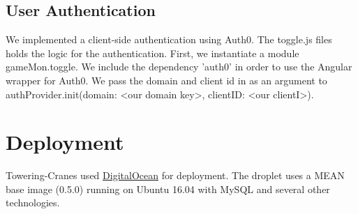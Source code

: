 \documentclass{article}
\begin{document}
\subsection{User Authentication}
We implemented a client-side authentication using Auth0. The toggle.js files holds the logic for the authentication. First, we instantiate a module gameMon.toggle. We include the dependency 'auth0' in order to use the Angular wrapper for Auth0. We pass the domain and client id in as an argument to authProvider.init({domain: <our domain key>, clientID: <our clientI>}).

\section{Deployment}
Towering-Cranes used \href{http://www.digitalocean.com/}{DigitalOcean} for deployment. The droplet uses a MEAN base image (0.5.0) running on Ubuntu 16.04 with MySQL and several other technologies.
\end{document}
